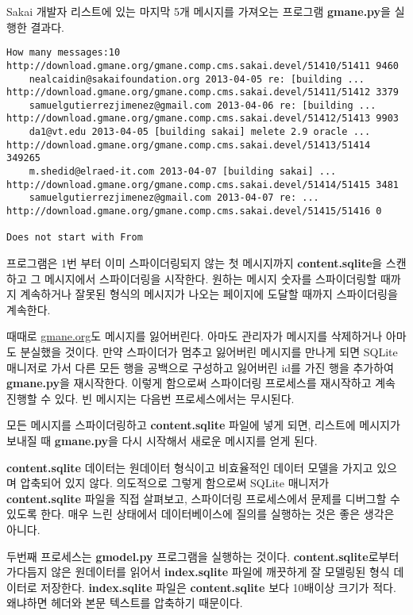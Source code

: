 Sakai 개발자 리스트에 있는 마지막 5개 메시지를 가져오는 프로그램 {\bf gmane.py}을 실행한 결과다.

\beforeverb
\begin{verbatim}
How many messages:10
http://download.gmane.org/gmane.comp.cms.sakai.devel/51410/51411 9460
    nealcaidin@sakaifoundation.org 2013-04-05 re: [building ...
http://download.gmane.org/gmane.comp.cms.sakai.devel/51411/51412 3379
    samuelgutierrezjimenez@gmail.com 2013-04-06 re: [building ...
http://download.gmane.org/gmane.comp.cms.sakai.devel/51412/51413 9903
    da1@vt.edu 2013-04-05 [building sakai] melete 2.9 oracle ...
http://download.gmane.org/gmane.comp.cms.sakai.devel/51413/51414 349265
    m.shedid@elraed-it.com 2013-04-07 [building sakai] ...
http://download.gmane.org/gmane.comp.cms.sakai.devel/51414/51415 3481
    samuelgutierrezjimenez@gmail.com 2013-04-07 re: ...
http://download.gmane.org/gmane.comp.cms.sakai.devel/51415/51416 0

Does not start with From 
\end{verbatim}
\afterverb
%

프로그램은 1번 부터 이미 스파이더링되지 않는 첫 메시지까지 {\bf content.sqlite}을 스캔하고 그 메시지에서 스파이더링을 시작한다. 
원하는 메시지 숫자를 스파이더링할 때까지 계속하거나 잘못된 형식의 메시지가 나오는 페이지에 도달할 때까지 스파이더링을 계속한다.

때때로 \url{gmane.org}도 메시지를 잃어버린다. 
아마도 관리자가 메시지를 삭제하거나 아마도 분실했을 것이다. 
만약 스파이더가 멈추고 잃어버린 메시지를 만나게 되면 SQLite 매니저로 가서 다른 모든 행을 공백으로 구성하고 잃어버린 id를 가진 행을 추가하여 {\bf gmane.py}을 재시작한다. 
이렇게 함으로써 스파이더링 프로세스를 재시작하고 계속 진행할 수 있다.
빈 메시지는 다음번 프로세스에서는 무시된다.

모든 메시지를 스파이더링하고 {\bf content.sqlite} 파일에 넣게 되면, 
리스트에 메시지가 보내질 때 {\bf gmane.py}을 다시 시작해서 새로운 메시지를 얻게 된다.

{\bf content.sqlite} 데이터는 원데이터 형식이고 비효율적인 데이터 모델을 가지고 있으며 압축되어 있지 않다.
의도적으로 그렇게 함으로써 SQLite 매니저가 {\bf content.sqlite} 파일을 직접 살펴보고, 스파이더링 프로세스에서 문제를 디버그할 수 있도록 한다. 
매우 느린 상태에서 데이터베이스에 질의를 실행하는 것은 좋은 생각은 아니다.

두번째 프로세스는 {\bf gmodel.py} 프로그램을 실행하는 것이다. 
{\bf content.sqlite}로부터 가다듬지 않은 원데이터를 읽어서 {\bf index.sqlite} 파일에 깨끗하게 잘 모델링된 형식 데이터로 저장한다.
{\bf index.sqlite} 파일은 {\bf content.sqlite} 보다 10배이상 크기가 적다. 
왜냐하면 헤더와 본문 텍스트를 압축하기 때문이다.


